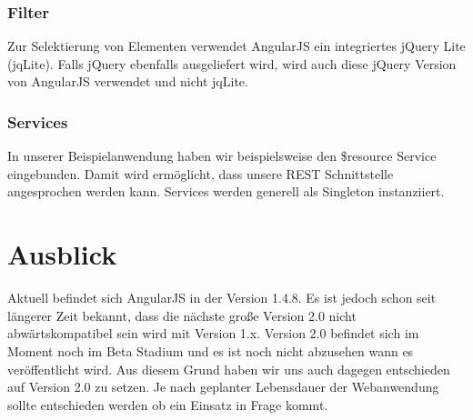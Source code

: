 \subsubsection{Filter}
Zur Selektierung von Elementen verwendet AngularJS ein integriertes jQuery Lite (jqLite).
Falls jQuery ebenfalls ausgeliefert wird, wird auch diese jQuery Version von AngularJS verwendet und nicht jqLite.

\subsubsection{Services}
In unserer Beispielanwendung haben wir beispielsweise den \$resource Service eingebunden.
Damit wird ermöglicht, dass unsere REST Schnittstelle angesprochen werden kann.
Services werden generell als Singleton instanziiert.

\section{Ausblick}
Aktuell befindet sich AngularJS in der Version 1.4.8.
Es ist jedoch schon seit längerer Zeit bekannt, dass die nächste große Version 2.0 nicht abwärtskompatibel sein wird mit Version 1.x.
Version 2.0 befindet sich im Moment noch im Beta Stadium und es ist noch nicht abzusehen wann es veröffentlicht wird.
Aus diesem Grund haben wir uns auch dagegen entschieden auf Version 2.0 zu setzen.
Je nach geplanter Lebensdauer der Webanwendung sollte entschieden werden ob ein Einsatz in Frage kommt.
